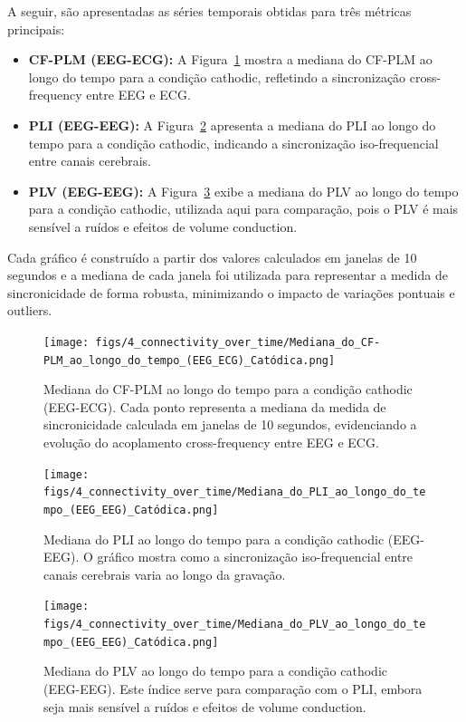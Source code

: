 A seguir, são apresentadas as séries temporais obtidas para três métricas principais:
\begin{itemize}
    \item \textbf{CF-PLM (EEG-ECG):} A Figura~\ref{fig:cfplm_time_cat} mostra a mediana do CF-PLM ao longo do tempo para a condição cathodic, refletindo a sincronização cross-frequency entre EEG e ECG.
    \item \textbf{PLI (EEG-EEG):} A Figura~\ref{fig:pli_time_cat} apresenta a mediana do PLI ao longo do tempo para a condição cathodic, indicando a sincronização iso-frequencial entre canais cerebrais.
    \item \textbf{PLV (EEG-EEG):} A Figura~\ref{fig:plv_time_cat} exibe a mediana do PLV ao longo do tempo para a condição cathodic, utilizada aqui para comparação, pois o PLV é mais sensível a ruídos e efeitos de volume conduction.
\end{itemize}

Cada gráfico é construído a partir dos valores calculados em janelas de 10 segundos e a mediana de cada janela foi utilizada para representar a medida de sincronicidade de forma robusta, minimizando o impacto de variações pontuais e outliers.

\begin{figure}[htb]
    \centering
    \texttt{[image: figs/4\_connectivity\_over\_time/Mediana\_do\_CF-PLM\_ao\_longo\_do\_tempo\_(EEG\_ECG)\_Catódica.png]}
    \caption{Mediana do CF-PLM ao longo do tempo para a condição cathodic (EEG-ECG). Cada ponto representa a mediana da medida de sincronicidade calculada em janelas de 10 segundos, evidenciando a evolução do acoplamento cross-frequency entre EEG e ECG.}
    \label{fig:cfplm_time_cat}
\end{figure}

\begin{figure}[htb]
    \centering
    \texttt{[image: figs/4\_connectivity\_over\_time/Mediana\_do\_PLI\_ao\_longo\_do\_tempo\_(EEG\_EEG)\_Catódica.png]}
    \caption{Mediana do PLI ao longo do tempo para a condição cathodic (EEG-EEG). O gráfico mostra como a sincronização iso-frequencial entre canais cerebrais varia ao longo da gravação.}
    \label{fig:pli_time_cat}
\end{figure}

\begin{figure}[htb]
    \centering
    \texttt{[image: figs/4\_connectivity\_over\_time/Mediana\_do\_PLV\_ao\_longo\_do\_tempo\_(EEG\_EEG)\_Catódica.png]}
    \caption{Mediana do PLV ao longo do tempo para a condição cathodic (EEG-EEG). Este índice serve para comparação com o PLI, embora seja mais sensível a ruídos e efeitos de volume conduction.}
    \label{fig:plv_time_cat}
\end{figure}
